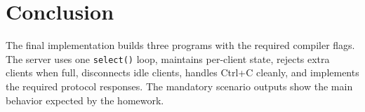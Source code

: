 \documentclass[11pt,a4paper]{article}
\begin{document}
\section{Conclusion}

The final implementation builds three programs with the required compiler flags. The server uses one
\texttt{select()} loop, maintains per-client state, rejects extra clients when full, disconnects idle
clients, handles Ctrl+C cleanly, and implements the required protocol responses. The mandatory
scenario outputs show the main behavior expected by the homework.
\end{document}
